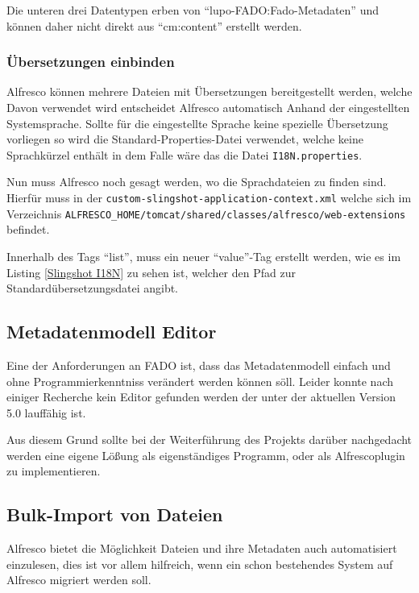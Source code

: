Die unteren drei Datentypen erben von "`lupo-FADO:Fado-Metadaten"' und k\"onnen daher nicht direkt aus "`cm:content"' erstellt werden.



\subsubsection{\"Ubersetzungen einbinden}
Alfresco k\"onnen mehrere Dateien mit \"Ubersetzungen bereitgestellt werden, welche Davon verwendet wird entscheidet Alfresco automatisch Anhand der eingestellten Systemsprache. Sollte f\"ur die eingestellte Sprache keine spezielle \"Ubersetzung vorliegen so wird die Standard-Properties-Datei verwendet, welche keine Sprachk\"urzel enth\"alt in dem Falle w\"are das die Datei \texttt{I18N.properties}. 

Nun muss Alfresco noch gesagt werden, wo die Sprachdateien zu finden sind. Hierf\"ur muss in der \texttt{custom-slingshot-application-context.xml} welche sich im Verzeichnis \texttt{ALFRESCO\_HOME/tomcat/shared/classes/alfresco/web-extensions} befindet.

Innerhalb des Tags "`list"', muss ein neuer "`value"'-Tag erstellt werden, wie es im Listing \ref{Slingshot I18N} zu sehen ist, welcher den Pfad zur Standard\"ubersetzungsdatei angibt.



\subsection{Metadatenmodell Editor}
Eine der Anforderungen an \ac{FADO} ist, dass das Metadatenmodell einfach und ohne Programmierkenntniss ver\"andert werden k\"onnen s\"oll. Leider konnte nach einiger Recherche kein Editor gefunden werden der unter der aktuellen Version 5.0 lauff\"ahig ist. 

Aus diesem Grund sollte bei der Weiterf\"uhrung des Projekts dar\"uber nachgedacht werden eine eigene L\"o\ss{}ung als eigenst\"andiges Programm, oder als Alfrescoplugin zu implementieren.

\subsection{Bulk-Import von Dateien}
Alfresco bietet die M\"oglichkeit Dateien und ihre Metadaten auch automatisiert einzulesen, dies ist vor allem hilfreich, wenn ein schon bestehendes System auf Alfresco migriert werden soll.


